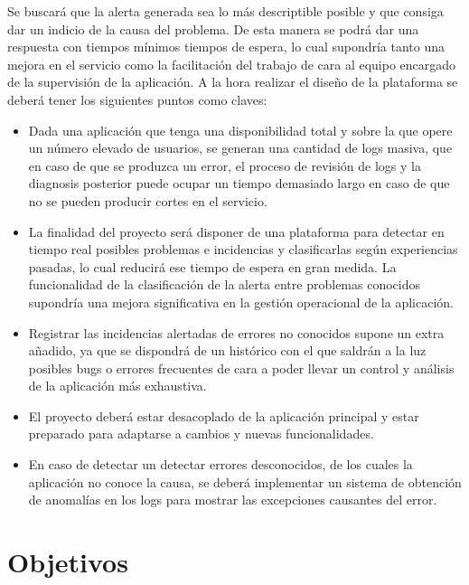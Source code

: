 Se buscará que la alerta generada sea lo más descriptible posible y que consiga dar un indicio de la causa del problema. De esta manera se podrá dar una respuesta con tiempos mínimos tiempos de espera, lo cual supondría tanto una mejora en el servicio como la facilitación del trabajo de cara al equipo encargado de la supervisión de la aplicación. A la hora realizar el diseño de la plataforma se deberá tener los siguientes puntos como claves: 

\begin{itemize}
\item Dada una aplicación que tenga una disponibilidad total y sobre la que opere un número elevado de usuarios, se generan una cantidad de logs masiva, que en caso de que se produzca un error, el proceso de revisión de logs y la diagnosis posterior puede ocupar un tiempo demasiado largo en caso de que no se pueden producir cortes en el servicio.

\item La finalidad del proyecto será disponer de una plataforma para detectar en tiempo real posibles problemas e incidencias y clasificarlas según experiencias pasadas, lo cual reducirá ese tiempo de espera en gran medida. La funcionalidad de la clasificación de la alerta entre problemas conocidos supondría una mejora significativa en la gestión operacional de la aplicación.

\item Registrar las incidencias alertadas de errores no conocidos supone un extra añadido, ya que se dispondrá de un histórico con el que saldrán a la luz posibles bugs o errores frecuentes de cara a poder llevar un control y análisis de la aplicación más exhaustiva.  

\item El proyecto deberá estar desacoplado de la aplicación principal y estar preparado para adaptarse a cambios y nuevas funcionalidades.

\item En caso de detectar un detectar errores desconocidos, de los cuales la aplicación no conoce la causa, se deberá implementar un sistema de obtención de anomalías en los logs para mostrar las excepciones causantes del error.

\end{itemize}




\section{Objetivos}

